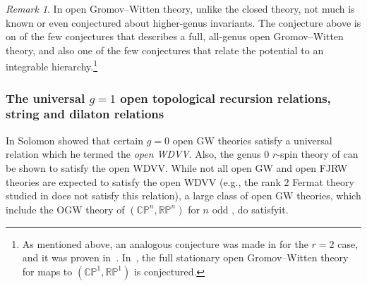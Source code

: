 \documentclass[11pt]{amsart}
\theoremstyle{definition}
\theoremstyle{remark}
\newtheorem{rmk}[dummy]{Remark}
\newcommand{\<}{\left<}
\renewcommand{\>}{\right>}
\numberwithin{equation}{section}
\begin{document}
\begin{rmk}
In open Gromov--Witten theory, unlike the closed theory, not much is known or even conjectured about higher-genus invariants. The conjecture above is on of the few conjectures that describes a full, all-genus open Gromov--Witten theory, and also one of the few conjectures that relate the potential to an integrable hierarchy.\footnote{%
As mentioned above, an %
analogous conjecture was made in \cite{PST14} for the $r=2$ case, and it was proven in~\cite{BT17}. In~\cite{BPTZ}, the full stationary open Gromov--Witten theory for maps to $(\mathbb{CP}^1,\mathbb{RP}^1)$ is conjectured.}
\end{rmk}
\subsubsection{The universal $g=1$ open topological recursion relations, string and dilaton relations}
In \cite{sol_owdvv} Solomon showed that certain $g=0$ open GW theories satisfy a universal relation which he termed the %
\emph{open WDVV}. Also, the %
genus $0$ $r$-spin theory of \cite{BCT1,BCT2,BCT3} can be shown to satisfy the open WDVV. While not all open GW and open FJRW theories are expected to satisfy the open %
WDVV (e.g., the rank $2$ Fermat %
theory studied in \cite{GKT2} does not satisfy this relation), a large class of open GW theories, which include  the OGW theory of $(\mathbb{CP}^n,\mathbb{RP}^n)$ for $n$ odd \cite{solomon2023relative},  %
do satisfyit.
\end{document}
